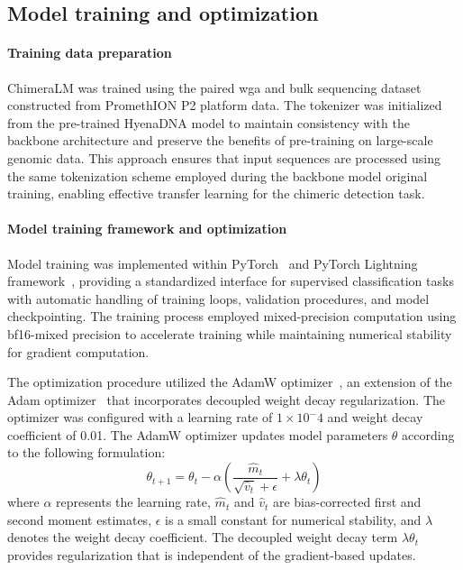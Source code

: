 \documentclass[pdflatex,sn-nature]{sn-jnl}%
\theoremstyle{thmstyleone}%
\theoremstyle{thmstyletwo}%
\theoremstyle{thmstylethree}%
\begin{document}
\subsection*{Model training and optimization}

\paragraph{Training data preparation}
ChimeraLM was trained using the paired \gls{wga} and bulk sequencing dataset constructed from PromethION P2 platform data.
The tokenizer was initialized from the pre-trained HyenaDNA model to maintain consistency with the backbone architecture and preserve the benefits of pre-training on large-scale genomic data.
This approach ensures that input sequences are processed using the same tokenization scheme employed during the backbone model original training, enabling effective transfer learning for the chimeric detection task.

\paragraph{Model training framework and optimization}
Model training was implemented within PyTorch~\cite{paszke2019pytorch} and PyTorch Lightning framework~\cite{Falcon_PyTorch_Lightning_2019}, providing a standardized interface for supervised classification tasks with automatic handling of training loops, validation procedures, and model checkpointing.
The training process employed mixed-precision computation using bf16-mixed precision to accelerate training while maintaining numerical stability for gradient computation.

The optimization procedure utilized the AdamW optimizer~\cite{adamw}, an extension of the Adam optimizer~\cite{kingma2014adam} that incorporates decoupled weight decay regularization.
The optimizer was configured with a learning rate of $1\times10^-4$ and weight decay coefficient of 0.01.
The AdamW optimizer updates model parameters $\theta$ according to the following formulation:
$$
	\theta_{t+1} = \theta_t - \alpha \left( \frac{\hat{m}_t}{\sqrt{\hat{v}_t} + \epsilon} + \lambda \theta_t \right)
$$
where $\alpha$ represents the learning rate, $\hat{m}_t$ and $\hat{v}_t$ are bias-corrected first and second moment estimates, $\epsilon$ is a small constant for numerical stability, and $\lambda$ denotes the weight decay coefficient.
The decoupled weight decay term $\lambda \theta_t$ provides regularization that is independent of the gradient-based updates.
\end{document}
